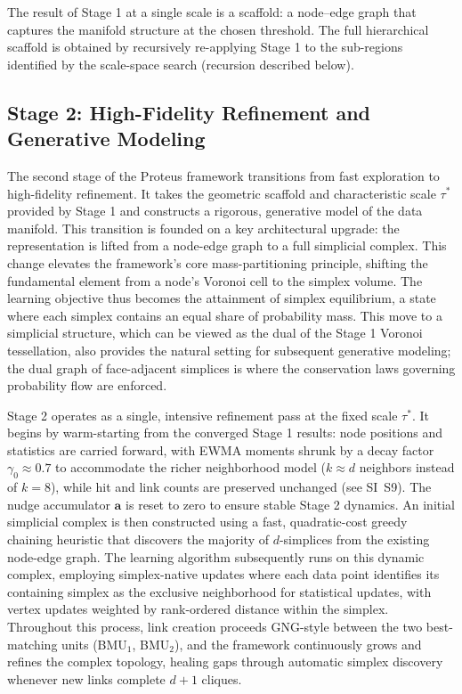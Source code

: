 \documentclass[11pt]{article}
\begin{document}
The result of Stage 1 at a single scale is a scaffold: a node–edge graph that captures the manifold structure at the chosen threshold. The full hierarchical scaffold is obtained by recursively re-applying Stage 1 to the sub-regions identified by the scale-space search (recursion described below).

\subsection{Stage 2: High-Fidelity Refinement and Generative Modeling}
The second stage of the Proteus framework transitions from fast exploration to high-fidelity refinement. It takes the geometric scaffold and characteristic scale $\tau^*$ provided by Stage 1 and constructs a rigorous, generative model of the data manifold. This transition is founded on a key architectural upgrade: the representation is lifted from a node-edge graph to a full simplicial complex. This change elevates the framework's core mass-partitioning principle, shifting the fundamental element from a node's Voronoi cell to the simplex volume. The learning objective thus becomes the attainment of simplex equilibrium, a state where each simplex contains an equal share of probability mass. This move to a simplicial structure, which can be viewed as the dual of the Stage 1 Voronoi tessellation, also provides the natural setting for subsequent generative modeling; the dual graph of face-adjacent simplices is where the conservation laws governing probability flow are enforced.

Stage 2 operates as a single, intensive refinement pass at the fixed scale $\tau^*$. It begins by warm-starting from the converged Stage 1 results: node positions and statistics are carried forward, with EWMA moments shrunk by a decay factor $\gamma_0 \approx 0.7$ to accommodate the richer neighborhood model ($k \approx d$ neighbors instead of $k=8$), while hit and link counts are preserved unchanged (see SI~S9). The nudge accumulator $\mathbf a$ is reset to zero to ensure stable Stage 2 dynamics. An initial simplicial complex is then constructed using a fast, quadratic-cost greedy chaining heuristic that discovers the majority of $d$-simplices from the existing node-edge graph. The learning algorithm subsequently runs on this dynamic complex, employing simplex-native updates where each data point identifies its containing simplex as the exclusive neighborhood for statistical updates, with vertex updates weighted by rank-ordered distance within the simplex. Throughout this process, link creation proceeds GNG-style between the two best-matching units (BMU$_1$, BMU$_2$), and the framework continuously grows and refines the complex topology, healing gaps through automatic simplex discovery whenever new links complete $d+1$ cliques.
\end{document}
